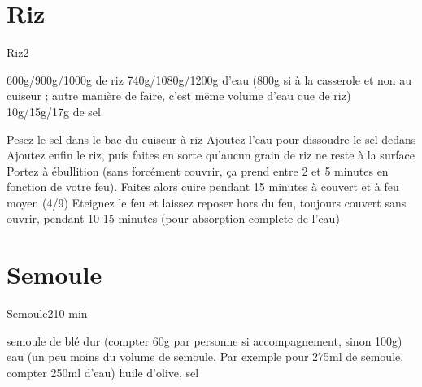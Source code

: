 {\section{Riz}
\begin{recette}{Riz}{2}{}{}\label{sec:riz}
\begin{ingredients}
\ingredient 600g/900g/1000g de riz
\ingredient 740g/1080g/1200g d'eau (800g si à la casserole et non au cuiseur ; autre manière de faire, c'est même volume d'eau que de riz)
\ingredient 10g/15g/17g de sel
\end{ingredients}

\begin{preparation}
\etape Pesez le sel dans le bac du cuiseur à riz
\etape Ajoutez l'eau pour dissoudre le sel dedans
\etape Ajoutez enfin le riz, puis faites en sorte qu'aucun grain de riz ne reste à la surface
\etape Portez à ébullition (sans forcément couvrir, ça prend entre 2 et 5 minutes en fonction de votre feu).
\etape Faites alors cuire pendant 15 minutes à couvert et à feu moyen (4/9)
\etape Eteignez le feu et laissez reposer hors du feu, toujours couvert sans ouvrir, pendant 10-15 minutes (pour absorption complete de l'eau)
\end{preparation}
\end{recette}

\section{Semoule}
\begin{recette}{Semoule}{2}{10 min}{}
\begin{ingredients}
\ingredient semoule de blé dur (compter 60g par personne si accompagnement, sinon 100g)
\ingredient eau (un peu moins du volume de semoule. Par exemple pour 275ml de semoule, compter 250ml d'eau)
\ingredient huile d'olive, sel
\end{ingredients}


\end{recette}}
